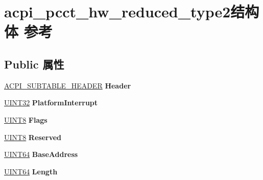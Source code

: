 \hypertarget{structacpi__pcct__hw__reduced__type2}{}\section{acpi\+\_\+pcct\+\_\+hw\+\_\+reduced\+\_\+type2结构体 参考}
\label{structacpi__pcct__hw__reduced__type2}
\subsection*{Public 属性}
\begin{DoxyCompactItemize}
\item 
\mbox{\label{structacpi__pcct__hw__reduced__type2_a0a45a782ad757c596fb9742abd82b61b}} 
\hyperlink{structacpi__subtable__header}{A\+C\+P\+I\+\_\+\+S\+U\+B\+T\+A\+B\+L\+E\+\_\+\+H\+E\+A\+D\+ER} {\bfseries Header}
\item 
\mbox{\label{structacpi__pcct__hw__reduced__type2_a095ecc7d2a529f2307bf3d6c7c46bd60}} 
\hyperlink{_processor_bind_8h_ae1e6edbbc26d6fbc71a90190d0266018}{U\+I\+N\+T32} {\bfseries Platform\+Interrupt}
\item 
\mbox{\label{structacpi__pcct__hw__reduced__type2_a5b57b48ff4308954d036cc6d9b69d6c5}} 
\hyperlink{_processor_bind_8h_ab27e9918b538ce9d8ca692479b375b6a}{U\+I\+N\+T8} {\bfseries Flags}
\item 
\mbox{\label{structacpi__pcct__hw__reduced__type2_ac9d59e52d47754aceab625f434fe486c}} 
\hyperlink{_processor_bind_8h_ab27e9918b538ce9d8ca692479b375b6a}{U\+I\+N\+T8} {\bfseries Reserved}
\item 
\mbox{\label{structacpi__pcct__hw__reduced__type2_a34842555c497ae381cc7f30fc156f209}} 
\hyperlink{_processor_bind_8h_a57be03562867144161c1bfee95ca8f7c}{U\+I\+N\+T64} {\bfseries Base\+Address}
\item 
\mbox{\label{structacpi__pcct__hw__reduced__type2_a6edfcd2f44c9403d8c01203cb4f62587}} 
\hyperlink{_processor_bind_8h_a57be03562867144161c1bfee95ca8f7c}{U\+I\+N\+T64} {\bfseries Length}

\end{DoxyCompactItemize}
